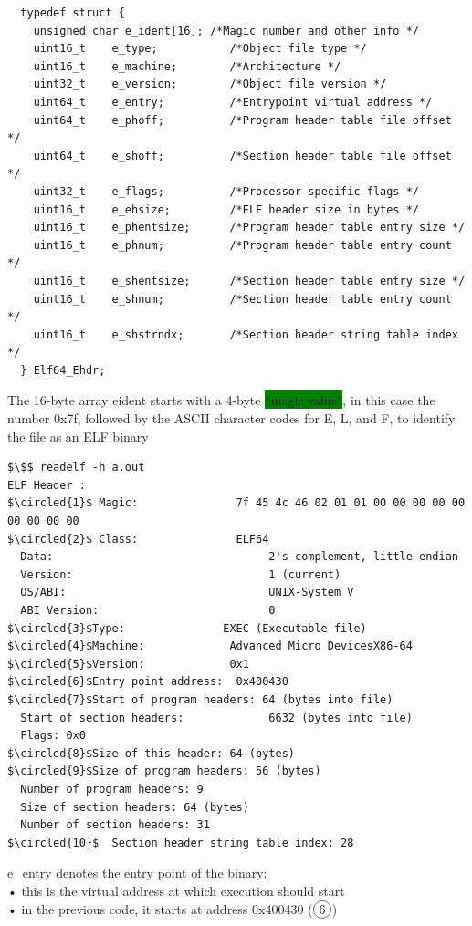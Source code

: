 \documentclass[]{project_plan}
\newcommand*\circled[1]{\tikz[baseline=(char.base)]{
            \node[shape=circle,draw,inner sep=2pt] (char) {#1};}}
\begin{document}
\begin{lstlisting}
  typedef struct {
    unsigned char e_ident[16]; /*Magic number and other info */
    uint16_t    e_type;           /*Object file type */
    uint16_t    e_machine;        /*Architecture */
    uint32_t    e_version;        /*Object file version */
    uint64_t    e_entry;          /*Entrypoint virtual address */
    uint64_t    e_phoff;          /*Program header table file offset */
    uint64_t    e_shoff;          /*Section header table file offset */
    uint32_t    e_flags;          /*Processor-specific flags */
    uint16_t    e_ehsize;         /*ELF header size in bytes */
    uint16_t    e_phentsize;      /*Program header table entry size */
    uint16_t    e_phnum;          /*Program header table entry count */
    uint16_t    e_shentsize;      /*Section header table entry size */
    uint16_t    e_shnum;          /*Section header table entry count */
    uint16_t    e_shstrndx;       /*Section header string table index */
  } Elf64_Ehdr;
\end{lstlisting}

The 16-byte array eident starts with a 4-byte \colorbox{green}{“magic value”}, in this case the number 0x7f, followed by
the ASCII character codes for E, L, and F, to identify the file as an ELF binary

\begin{lstlisting}[mathescape]
  $\$$ readelf -h a.out
ELF Header :
$\circled{1}$ Magic:               7f 45 4c 46 02 01 01 00 00 00 00 00 00 00 00 00
$\circled{2}$ Class:               ELF64
  Data:                                 2's complement, little endian
  Version:                              1 (current)
  OS/ABI:                               UNIX-System V
  ABI Version:                          0
$\circled{3}$Type:               EXEC (Executable file)
$\circled{4}$Machine:             Advanced Micro DevicesX86-64
$\circled{5}$Version:             0x1
$\circled{6}$Entry point address:  0x400430
$\circled{7}$Start of program headers: 64 (bytes into file)
  Start of section headers:             6632 (bytes into file)
  Flags: 0x0
$\circled{8}$Size of this header: 64 (bytes)
$\circled{9}$Size of program headers: 56 (bytes)
  Number of program headers: 9
  Size of section headers: 64 (bytes)
  Number of section headers: 31
$\circled{10}$  Section header string table index: 28
\end{lstlisting}

e\_entry denotes the entry point of the binary:\\
• this is the virtual address at which execution should start\\
• in the previous code, it starts at address 0x400430 ($\circled{6}$)
\end{document}
